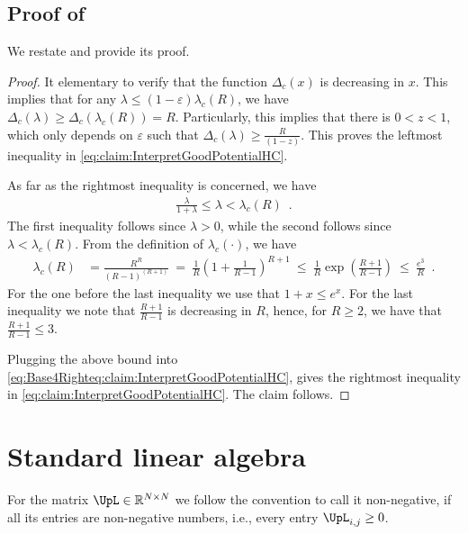 \documentclass[11pt,reqno]{amsart}
\numberwithin{equation}{section}
\newcommand{\dcritical}{{\Delta_c}}
\newcommand{\lcritical}{{\lambda_c}}
\begin{document}
\subsection{{Proof of }} \label{sec:claim:InterpretGoodPotentialHC}
We restate  and provide its proof.

\ElaborateGoodPotenHC*

\begin{proof}
It elementary to verify that the function $\dcritical(x)$ is decreasing in $x$. This implies that for any $\lambda\leq (1-\varepsilon)\lcritical(R)$, 
we have $\dcritical(\lambda)\geq \dcritical(\lcritical(R))=R$. Particularly, this implies that there is $0<z<1$, which only depends on 
$\varepsilon$ such that $\dcritical(\lambda) \geq \frac{R}{(1-z)}$.
This proves the leftmost inequality in \eqref{eq:claim:InterpretGoodPotentialHC}.

As far as the rightmost inequality is concerned, we have 
\begin{align}\label{eq:Base4Righteq:claim:InterpretGoodPotentialHC}
\textstyle \frac{\lambda}{1+\lambda} \leq \lambda < \lcritical(R) \enspace.
\end{align}
The first inequality follows since $\lambda>0$, while the second follows since $\lambda<\lcritical(R)$.
 From the definition of $\lcritical(\cdot)$, we have 
{\small 
\begin{align}
\lcritical(R)& =\frac{R^{R}}{(R-1)^{(R+1)}}\ = \ 
\frac{1}{R}\left( 1+\frac{1}{R-1}\right)^{R+1} \ \leq \ \frac{1}{R}\exp\left(\frac{R+1}{R-1}\right) 
\ \leq \ \frac{e^3}{R} \enspace. 
\end{align}
}
For the one before the last inequality we use that $1+x\leq e^{x}$. For the last inequality we note that $\frac{R+1}{R-1}$ is decreasing in 
$R$, hence, for $R\geq 2$, we have that $\frac{R+1}{R-1}\leq 3$. 

Plugging the above bound into \eqref{eq:Base4Righteq:claim:InterpretGoodPotentialHC}, gives the rightmost inequality in
\eqref{eq:claim:InterpretGoodPotentialHC}. 
%
The claim follows. 
\end{proof}


\section{Standard linear algebra}\label{sec:PerronFrobeniusThrm}

For the matrix $\UpL \in \mathbb{R}^{N\times N}$ we follow the convention to call it non-negative, if all its entries are non-negative numbers, i.e., every entry $\UpL_{i,j}\geq 0$.
\end{document}
